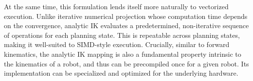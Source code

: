 \documentclass[letterpaper, 10 pt, conference]{ieeeconf}
\begin{document}
At the same time, this formulation lends itself more naturally to vectorized execution. Unlike iterative numerical projection whose computation time depends on the convergence, analytic IK evaluates a predetermined, non-iterative sequence of operations for each planning state. 
This is repeatable across planning states, making it well-suited to SIMD-style execution. 
Crucially, similar to forward kinematics, the analytic IK mapping is also a fundamental property intrinsic to the kinematics of a robot, and thus can be precompiled once for a given robot. Its implementation can be specialized and optimized for the underlying hardware. 
\end{document}
